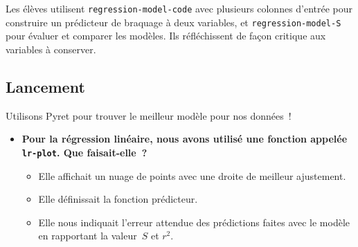 \documentclass[12pt,a4paper]{article}
\begin{document}
\begin{overviewbox}
  Les élèves utilisent \texttt{regression-model-code} avec plusieurs colonnes d'entrée pour construire un prédicteur de braquage à deux variables, et \texttt{regression-model-S} pour évaluer et comparer les modèles. Ils réfléchissent de façon critique aux variables à conserver.
\end{overviewbox}

\subsection{Lancement}

 Utilisons Pyret pour trouver le meilleur modèle pour nos données~!

\begin{thinkbox}
  \begin{itemize}
    \item \textbf{Pour la régression linéaire, nous avons utilisé une fonction appelée \texttt{lr-plot}. Que faisait-elle~?}
    \begin{itemize}
      \item Elle affichait un nuage de points avec une droite de meilleur ajustement.
      \item Elle définissait la fonction prédicteur.
      \item Elle nous indiquait l'erreur attendue des prédictions faites avec le modèle en rapportant la valeur~$S$ et $r^2$.
    \end{itemize}
  \end{itemize}
\end{thinkbox}
\end{document}
